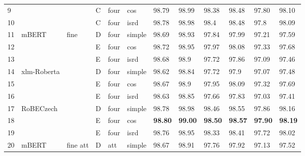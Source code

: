 \begin{table}[!h]
{\begin{tabular}{|l|l|l|l|l|l||llllll|}
9  &                              &                         & C	& four                     & cos    & 98.79  & 98.99   & 98.38   & 98.48    & 97.80      & 98.10      \\ \cline{1-1} \cline{4-12}
10 &                              &                         & C	& four                     & isrd   & 98.78  & 98.98   & 98.4    & 98.48    & 97.8      & 98.09      \\ \hline
11 & \multirow{3}{*}{mBERT} & \multirow{9}{*}{fine}         & D	& four     & simple & 98.69 & 98.93 & 97.84 & 97.99 & 97.21 & 97.59 \\ \cline{1-1} \cline{4-12}
12 &                              &                         & E	& four             & cos    & 98.72  & 98.95   & 97.97   & 98.08    & 97.33     & 97.68      \\ \cline{1-1} \cline{4-12}
13 &                              &                         & E	& four             & isrd   & 98.68  & 98.9    & 97.72   & 97.86    & 97.09     & 97.46      \\ \cline{1-2} \cline{4-12}
14 & \multirow{3}{*}{xlm-Roberta} &                         & D	& four     & simple & 98.62  & 98.84   & 97.72   & 97.9     & 97.07     & 97.48      \\ \cline{1-1} \cline{4-12}
15 &                              &                         & E	& four             & cos    & 98.67  & 98.9    & 97.95   & 98.09    & 97.32     & 97.69      \\ \cline{1-1} \cline{4-12}
16 &                              &                         & E	& four             & isrd   & 98.63  & 98.85   & 97.66   & 97.83    & 97.03     & 97.41      \\ \cline{1-2} \cline{4-12}
17 & \multirow{3}{*}{RoBECzech}   &                         & D	& four     & simple & 98.78  & 98.98   & 98.46   & 98.55    & 97.86     & 98.16      \\ \cline{1-1} \cline{4-12}
18 &                              &                         & E	& four             & cos    & \textbf{98.80}   & \textbf{99.00 }     & \textbf{98.50}    & \textbf{98.57}    & \textbf{97.90 }     & \textbf{98.19 }     \\ \cline{1-1} \cline{4-12}
19 &                              &                         & E	& four             & isrd   & 98.76  & 98.95   & 98.33   & 98.41    & 97.72     & 98.02      \\ \cline{1-2} \cline{4-12} \hline
20 & \multirow{3}{*}{mBERT}  &  \multirow{9}{*}{fine att}   & D	& att                       & simple & 98.67  & 98.91   & 97.76   & 97.92    & 97.13     & 97.52      \\ \cline{1-1} \cline{4-12}

\end{tabular}}
\end{table}
